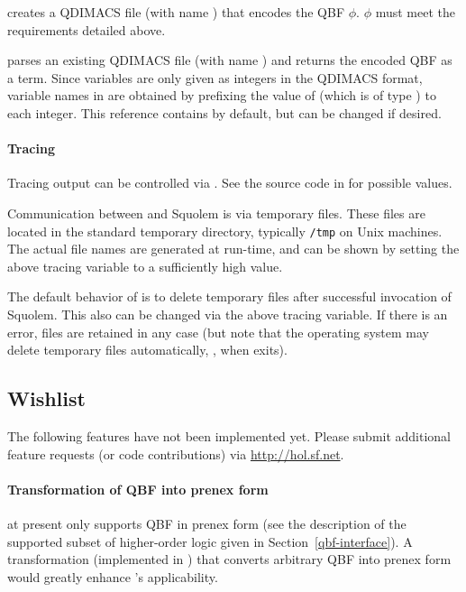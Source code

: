  creates a QDIMACS file
(with name ) that encodes the QBF $\phi$.  $\phi$ must meet
the requirements detailed above.

 parses an existing QDIMACS file
(with name ) and returns the encoded QBF as a \HOL{} term.
Since variables are only given as integers in the QDIMACS format,
variable names in \HOL{} are obtained by prefixing the value of
 (which is of type ) to each
integer.  This reference contains  by default, but can be
changed if desired.

\paragraph{Tracing}

Tracing output can be controlled via .  See the source code in  for possible
values.

Communication between \HOL{} and Squolem is via temporary files.
These files are located in the standard temporary directory, typically
{\tt /tmp} on Unix machines.  The actual file names are generated at
run-time, and can be shown by setting the above tracing variable to a
sufficiently high value.

The default behavior of  is to delete temporary files
after successful invocation of Squolem.  This also can be changed via
the above tracing variable.  If there is an error, files are retained
in any case (but note that the operating system may delete temporary
files automatically, \eg, when \HOL{} exits).

\subsection{Wishlist}

The following features have not been implemented yet.  Please submit
additional feature requests (or code contributions) via
\url{http://hol.sf.net}.

\paragraph{Transformation of QBF into prenex form}

 at present only supports QBF in prenex form (see the
description of the supported subset of higher-order logic given in
Section~\ref{qbf-interface}).  A transformation (implemented in \HOL)
that converts arbitrary QBF into prenex form would greatly enhance
's applicability.

